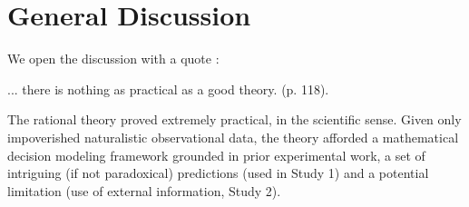 \documentclass[a4paper,man,natbib]{apa6}
\begin{document}
\section{General Discussion}\label{discussion}
\noindent
We open the discussion with a quote \citep{Lewin1943}:
\begin{displayquote}
... there is nothing as practical as a good theory. (p. 118).
\end{displayquote}
The rational theory proved extremely practical, in the scientific sense.  Given only impoverished naturalistic observational data, the theory afforded a mathematical decision modeling framework grounded in prior experimental work\citep{GriffithsTenenbaum2006,GriffithsTenenbaum2011}, a set of intriguing (if not paradoxical) predictions (used in Study 1) and a potential limitation (use of external information, Study 2).  
\end{document}

